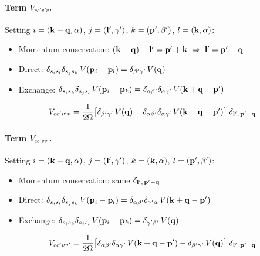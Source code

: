 \documentclass[11pt,letterpaper]{article}
\theoremstyle{definition}
\theoremstyle{plain}
\theoremstyle{remark}
\begin{document}
\paragraph{Term $V_{cc'v'v}$.}
Setting $i = (\vb{k}+\vb{q},\alpha)$, $j = (\vb{l}',\gamma')$, $k = (\vb{p}',\beta')$, $l = (\vb{k},\alpha)$:
\begin{itemize}
    \item Momentum conservation: $(\vb{k}+\vb{q}) + \vb{l}' = \vb{p}' + \vb{k} \;\Rightarrow\; \vb{l}' = \vb{p}' - \vb{q}$
    \item Direct: $\delta_{s_i s_l}\delta_{s_j s_k}\,V(\vb{p}_i - \vb{p}_l) = \delta_{\beta'\gamma'}\,V(\vb{q})$
    \item Exchange: $\delta_{s_i s_k}\delta_{s_j s_l}\,V(\vb{p}_i - \vb{p}_k) = \delta_{\alpha\beta'}\delta_{\alpha\gamma'}\,V(\vb{k}+\vb{q}-\vb{p}')$
\end{itemize}
\begin{gather}
    V_{cc'v'v} = \frac{1}{2\Omega}\bigl[\delta_{\beta'\gamma'}\,V(\vb{q}) - \delta_{\alpha\beta'}\delta_{\alpha\gamma'}\,V(\vb{k}+\vb{q}-\vb{p}')\bigr]\;\delta_{\vb{l}',\,\vb{p}'-\vb{q}}
\end{gather}

\paragraph{Term $V_{cc'vv'}$.}
Setting $i = (\vb{k}+\vb{q},\alpha)$, $j = (\vb{l}',\gamma')$, $k = (\vb{k},\alpha)$, $l = (\vb{p}',\beta')$:
\begin{itemize}
    \item Momentum conservation: same $\delta_{\vb{l}',\,\vb{p}'-\vb{q}}$
    \item Direct: $\delta_{s_i s_l}\delta_{s_j s_k}\,V(\vb{p}_i - \vb{p}_l) = \delta_{\alpha\beta'}\delta_{\gamma'\alpha}\,V(\vb{k}+\vb{q}-\vb{p}')$
    \item Exchange: $\delta_{s_i s_k}\delta_{s_j s_l}\,V(\vb{p}_i - \vb{p}_k) = \delta_{\gamma'\beta'}\,V(\vb{q})$
\end{itemize}
\begin{gather}
    V_{cc'vv'} = \frac{1}{2\Omega}\bigl[\delta_{\alpha\beta'}\delta_{\alpha\gamma'}\,V(\vb{k}+\vb{q}-\vb{p}') - \delta_{\beta'\gamma'}\,V(\vb{q})\bigr]\;\delta_{\vb{l}',\,\vb{p}'-\vb{q}}
\end{gather}
\end{document}
